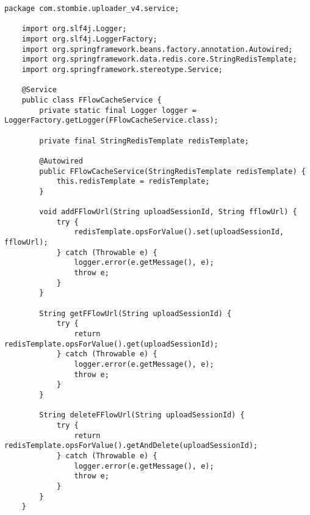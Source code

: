 \begin{lstlisting}[caption={FFlowCacheService.java}]
	package com.stombie.uploader_v4.service;
	
	import org.slf4j.Logger;
	import org.slf4j.LoggerFactory;
	import org.springframework.beans.factory.annotation.Autowired;
	import org.springframework.data.redis.core.StringRedisTemplate;
	import org.springframework.stereotype.Service;
	
	@Service
	public class FFlowCacheService {
		private static final Logger logger = LoggerFactory.getLogger(FFlowCacheService.class);
		
		private final StringRedisTemplate redisTemplate;
		
		@Autowired
		public FFlowCacheService(StringRedisTemplate redisTemplate) {
			this.redisTemplate = redisTemplate;
		}
		
		void addFFlowUrl(String uploadSessionId, String fflowUrl) {
			try {
				redisTemplate.opsForValue().set(uploadSessionId, fflowUrl);
			} catch (Throwable e) {
				logger.error(e.getMessage(), e);
				throw e;
			}
		}
		
		String getFFlowUrl(String uploadSessionId) {
			try {
				return redisTemplate.opsForValue().get(uploadSessionId);
			} catch (Throwable e) {
				logger.error(e.getMessage(), e);
				throw e;
			}
		}
		
		String deleteFFlowUrl(String uploadSessionId) {
			try {
				return redisTemplate.opsForValue().getAndDelete(uploadSessionId);
			} catch (Throwable e) {
				logger.error(e.getMessage(), e);
				throw e;
			}
		}
	}
\end{lstlisting}

